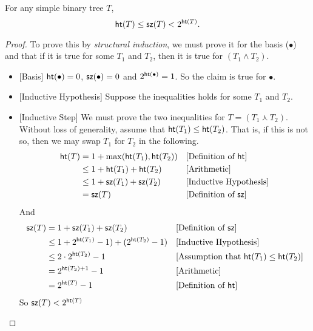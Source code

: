 \begin{lemma}
For any simple binary tree $T$,  \[\mathord{\textsf{ht}}(T)\leq \mathord{\textsf{sz}}(T) < 2^{\mathord{\textsf{ht}}(T)}.\]

\begin{proof}
To prove this by \emph{structural induction}, we must prove it for the basis ($\bullet$)
and that if it is true for some $T_1$ and $T_2$, then it is true for $(T_1\wedge T_2)$.
\begin{itemize}
\item{}[Basis] $\mathord{\textsf{ht}}(\bullet) = 0$, $\mathord{\textsf{sz}}(\bullet) = 0$ 
and $2^{\mathord{\textsf{ht}}(\bullet)} = 1$. So the claim is true for $\bullet$.
\item{}[Inductive Hypothesis] Suppose the inequalities holds for some $T_1$ and $T_2$.
\item{}[Inductive Step] We must prove the two inequalities for $T= (T_1\curlywedge T_2)$.
Without loss of generality, assume that $\mathord{\textsf{ht}}(T_1)\leq \mathord{\textsf{ht}}(T_2)$. That is, if 
this is not so, then we may swap $T_1$ for $T_2$ in the following. 
\begin{align*}
\mathord{\textsf{ht}}(T) &= 1 + \max(\mathord{\textsf{ht}}(T_1),\mathord{\textsf{ht}}(T_2)) &&\text{[Definition of $\mathord{\textsf{ht}}$]}\\
         &\leq 1 + \mathord{\textsf{ht}}(T_1) + \mathord{\textsf{ht}}(T_2)  &&\text{[Arithmetic]}\\
         &\leq  1 + \mathord{\textsf{sz}}(T_1) + \mathord{\textsf{sz}}(T_2) &&\text{[Inductive Hypothesis]}\\
         &= \mathord{\textsf{sz}}(T) &&\text{[Definition of $\mathord{\textsf{sz}}$]}
       \end{align*}
And
\begin{align*}
\mathord{\textsf{sz}}(T) &= 1 +\mathord{\textsf{sz}}(T_1) + \mathord{\textsf{sz}}(T_2)&&\text{[Definition of $\mathord{\textsf{sz}}$]}\\
       &\leq 1 + 2^{\mathord{\textsf{ht}}(T_1)} - 1) + (2^{\mathord{\textsf{ht}}(T_2)} - 1)&&\text{[Inductive Hypothesis]}\\
       &\leq 2\cdot 2^{\mathord{\textsf{ht}}(T_2)} - 1&&\text{[Assumption that $\mathord{\textsf{ht}}(T_1)\leq \mathord{\textsf{ht}}(T_2)$]}\\
       &= 2^{\mathord{\textsf{ht}}(T_2)+1} - 1 &&\text{[Arithmetic]}\\
       &= 2^{\mathord{\textsf{ht}}(T)} - 1 &&\text{[Definition of $\mathord{\textsf{ht}}$]}
     \end{align*}
So $\mathord{\textsf{sz}}(T) < 2^{\mathord{\textsf{ht}}(T)}$
   \end{itemize}
 \end{proof}  
\end{lemma}

\ipadbreak

